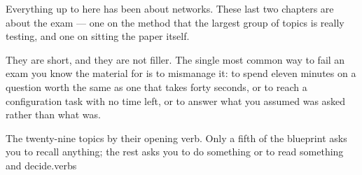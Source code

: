 
\vspace*{0.4cm}
Everything up to here has been about networks. These last two chapters are about
the exam --- one on the method that the largest group of topics is really
testing, and one on sitting the paper itself.

They are short, and they are not filler. The single most common way to fail an
exam you know the material for is to mismanage it: to spend eleven minutes on a
question worth the same as one that takes forty seconds, or to reach a
configuration task with no time left, or to answer what you assumed was asked
rather than what was.

%
{The twenty-nine topics by their opening verb. Only a fifth of the blueprint asks
you to recall anything; the rest asks you to do something or to read something
and decide.}{verbs}

